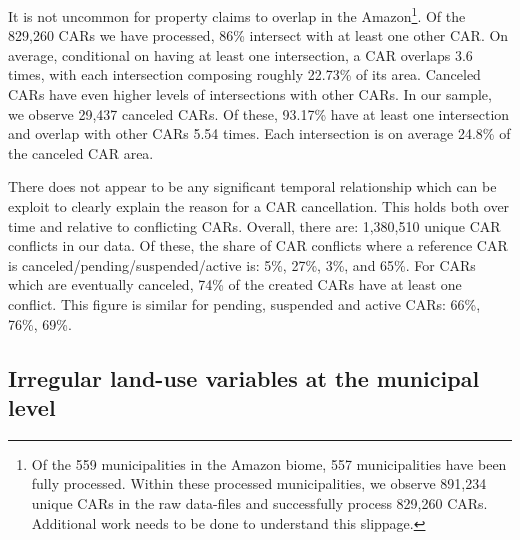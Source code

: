\documentclass[12pt]{article}
\begin{document}
\begin{appendices}
It is not uncommon for property claims to overlap in the Amazon\footnote{Of the 559 municipalities in the Amazon biome, 557 municipalities have been fully processed. Within these processed municipalities, we observe 891,234 unique CARs in the raw data-files and successfully process 829,260 CARs. Additional work needs to be done to understand this slippage.}. Of the 829,260 CARs we have processed, 86\% intersect with at least one other CAR. On average, conditional on having at least one intersection, a CAR overlaps 3.6 times, with each intersection composing roughly 22.73\% of its area. Canceled CARs have even higher levels of intersections with other CARs. In our sample, we observe 29,437 canceled CARs. Of these, 93.17\% have at least one intersection and overlap with other CARs 5.54 times. Each intersection is on average 24.8\% of the canceled CAR area. %
\

\quad There does not appear to be any significant temporal relationship which can be exploit to clearly explain the reason for a CAR cancellation. This holds both over time and relative to conflicting CARs. Overall, there are: 1,380,510 unique CAR conflicts in our data. Of these, the share of CAR conflicts where a reference CAR is canceled/pending/suspended/active is: 5\%, 27\%, 3\%, and 65\%. For CARs which are eventually canceled, 74\% of the created CARs have at least one conflict. This figure is similar for pending, suspended and active CARs: 66\%, 76\%, 69\%. %




     \subsection{Irregular land-use variables at the municipal level}


\end{appendices}
\end{document}
